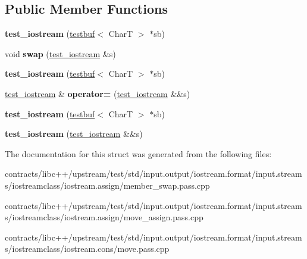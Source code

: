 \subsection*{Public Member Functions}
\begin{DoxyCompactItemize}
\item 
\mbox{\label{structtest__iostream_a99915a6c0e71f2312d0c3d100107e7e0}} 
{\bfseries test\+\_\+iostream} (\mbox{\hyperlink{structtestbuf}{testbuf}}$<$ CharT $>$ $\ast$sb)
\item 
\mbox{\label{structtest__iostream_a9f28f58d34c680179eb15bcd1513c64f}} 
void {\bfseries swap} (\mbox{\hyperlink{structtest__iostream}{test\+\_\+iostream}} \&s)
\item 
\mbox{\label{structtest__iostream_a99915a6c0e71f2312d0c3d100107e7e0}} 
{\bfseries test\+\_\+iostream} (\mbox{\hyperlink{structtestbuf}{testbuf}}$<$ CharT $>$ $\ast$sb)
\item 
\mbox{\label{structtest__iostream_accf9c99ce017ebdccfd0abd3d368efdc}} 
\mbox{\hyperlink{structtest__iostream}{test\+\_\+iostream}} \& {\bfseries operator=} (\mbox{\hyperlink{structtest__iostream}{test\+\_\+iostream}} \&\&s)
\item 
\mbox{\label{structtest__iostream_a99915a6c0e71f2312d0c3d100107e7e0}} 
{\bfseries test\+\_\+iostream} (\mbox{\hyperlink{structtestbuf}{testbuf}}$<$ CharT $>$ $\ast$sb)
\item 
\mbox{\label{structtest__iostream_a7f4c78c040b9c2236ffa629d6be06784}} 
{\bfseries test\+\_\+iostream} (\mbox{\hyperlink{structtest__iostream}{test\+\_\+iostream}} \&\&s)
\end{DoxyCompactItemize}


The documentation for this struct was generated from the following files\+:\begin{DoxyCompactItemize}
\item 
contracts/libc++/upstream/test/std/input.\+output/iostream.\+format/input.\+streams/iostreamclass/iostream.\+assign/member\+\_\+swap.\+pass.\+cpp\item 
contracts/libc++/upstream/test/std/input.\+output/iostream.\+format/input.\+streams/iostreamclass/iostream.\+assign/move\+\_\+assign.\+pass.\+cpp\item 
contracts/libc++/upstream/test/std/input.\+output/iostream.\+format/input.\+streams/iostreamclass/iostream.\+cons/move.\+pass.\+cpp\end{DoxyCompactItemize}

